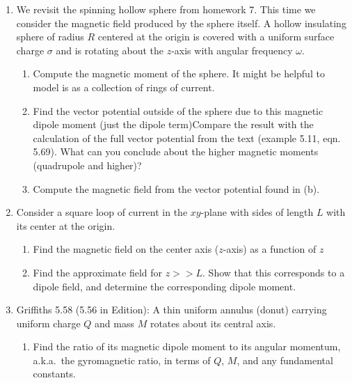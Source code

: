 \begin{enumerate}

  \item We revisit the spinning hollow sphere from homework 7. This time we consider the magnetic field produced by the sphere itself.  A hollow insulating sphere of radius $R$ centered at the origin is covered with a uniform surface charge $\sigma$ and is rotating about the $z$-axis with angular frequency $\omega$.

    \begin{enumerate}

      \item Compute the magnetic moment of the sphere. It might be helpful to model is as a collection of rings of current.

      \item Find the vector potential outside of the sphere due to this magnetic dipole moment (just the dipole term)Compare the result with the calculation of the full vector potential from the text (example 5.11, eqn. 5.69).  What can you conclude about the higher magnetic moments (quadrupole and higher)?

      \item Compute the magnetic field from the vector potential found in (b).

    \end{enumerate}

  \item Consider a square loop of current in the $xy$-plane with sides of length $L$ with its center at the origin.

    \begin{enumerate}

      \item Find the magnetic field on the center axis ($z$-axis) as a function of $z$

      \item Find the approximate field for $z>>L$.  Show that this corresponds to a dipole field, and determine the corresponding dipole moment.

    \end{enumerate}

  \item Griffiths 5.58 (5.56 in  Edition): A thin uniform annulus (donut) carrying uniform charge $Q$ and mass $M$ rotates about its central axis.

    \begin{enumerate}

      \item Find the ratio of its magnetic dipole moment to its angular momentum, a.k.a.\ the gyromagnetic ratio, in terms of $Q$, $M$, and any fundamental constants.


\end{enumerate}
\end{enumerate}
